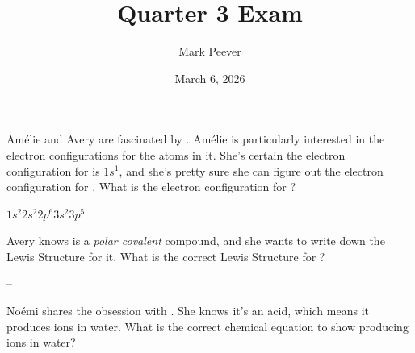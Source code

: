 \documentclass[11pt,addpoints]{exam}   	%
\title{Quarter 3 Exam}
\author{Mark Peever}
\date{March 6, 2026}							%
\begin{document}
\maketitle

\pointsinrightmargin
\printanswers

\begin{center}
\end{center}
\vspace{0.1in}
\vspace{0.2in}

\begin{questions}

\question[5] Am\'elie and Avery are fascinated by . Am\'elie is particularly interested in the electron configurations for the atoms in it. 
She's certain the electron configuration for  is $1s^{1}$, and she's pretty sure she can figure out the electron configuration for .
What is the electron configuration for ?

\begin{solution}
$1s^{2} 2s^{2} 2p^{6} 3s^{2} 3p^{5}$
\end{solution}

\vspace{0.2in}


\question[5] Avery knows  is a \emph{polar covalent} compound, and she wants to write down the Lewis Structure for it.
What is the correct Lewis Structure for ?

\begin{solution}
\hspace{-0.5em}--\hspace{-0.75em}
\end{solution}

\vspace{0.2in}

\clearpage
\question[5] No\'emi shares the obsession with . She knows it's an acid, which means it produces  ions in water.
What is the correct chemical equation to show  producing  ions in water?

\begin{solution}
\end{solution}


\end{questions}
\end{document}
